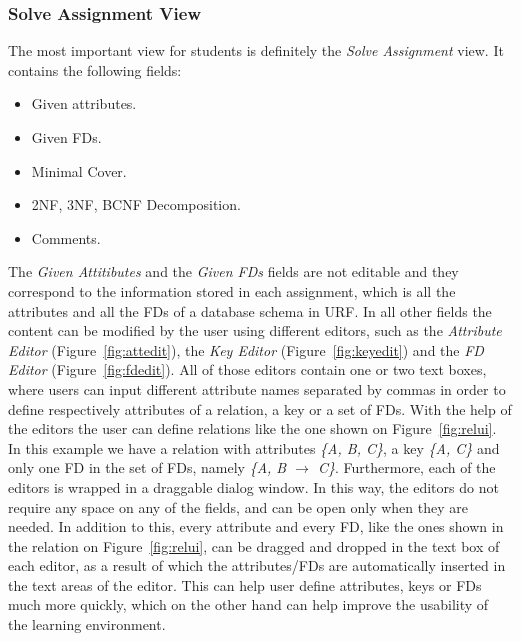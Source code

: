 \subsubsection{Solve Assignment View}
The most important view for students is definitely the \textit{Solve Assignment} view.
It contains the following fields:

\begin{itemize}
	\item Given attributes.
	\item Given FDs.
	\item Minimal Cover.
	\item 2NF, 3NF, BCNF Decomposition.
	\item Comments.
\end{itemize}

The \textit{Given Attitibutes} and the \textit{Given FDs} fields are not editable
and they correspond	to the information stored in each assignment, which is all the 
attributes and all the FDs of a database schema in URF. In all other fields 
the content can be modified by the user using different editors,
such as the \textit{Attribute Editor} (Figure~\ref{fig:attedit}), 
the \textit{Key Editor} (Figure~\ref{fig:keyedit}) and the \textit{FD Editor}
(Figure~\ref{fig:fdedit}).
All of those editors contain one or two text boxes, where users can input 
different attribute names separated by commas
in order to define respectively attributes of a relation, a key or a set of FDs. With
the help of the editors the user can define relations like the one shown on 
Figure~\ref{fig:relui}. In this example we have a relation with attributes 
\textit{\{A, B, C\}}, a key \textit{\{A, C\}} and only one FD in the set of FDs,
namely \textit{\{A, B $\rightarrow$ C\}}.  Furthermore,
each of the editors is wrapped in a draggable dialog window. 
In this way, the editors do not require any space on any of the fields, 
and can be open only when they are needed. In addition to this, every attribute and every FD,
like the ones shown in the relation on Figure~\ref{fig:relui}, can be dragged and
dropped in the text box of each editor, as a result of which the attributes/FDs
are automatically inserted in the text areas of the editor.
This can help user define attributes, keys or
FDs much more quickly, which on the other hand can help improve the usability of 
the learning environment. 

